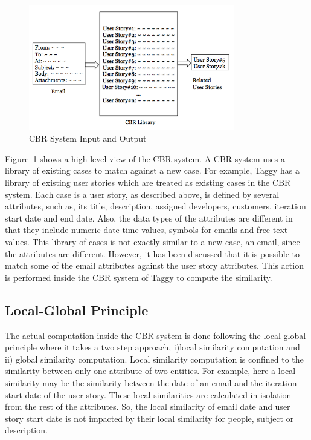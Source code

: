 \begin{figure}[bt]
	\centering
	\includegraphics[width=0.8\textwidth]{CBR.png}
    \caption{CBR System Input and Output}
	\label{fig:CBR}
\end{figure}

Figure~\ref{fig:CBR} shows a high level view of the CBR system. A CBR system uses a library of existing cases to match against a new case. For example, Taggy has a library of existing user stories which are treated as existing cases in the CBR system. Each case is a user story, as described above, is defined by several attributes, such as, its title, description, assigned developers, customers, iteration start date and end date. Also, the data types of the attributes are different in that they include numeric date time values, symbols for emails and free text values. This library of cases is not exactly similar to a new case, an email, since the attributes are different. However, it has been discussed that it is possible to match some of the email attributes against the user story attributes. This action is performed inside the CBR system of Taggy to compute the similarity.


\subsection{Local-Global Principle}

The actual computation inside the CBR system is done following the local-global principle\cite{local_global} where it takes a two step approach, i)local similarity computation and ii) global similarity computation. Local similarity computation is confined to the similarity between only one attribute of two entities. For example, here a local similarity may be the similarity between the date of an email and the iteration start date of the user story. These local similarities are calculated in isolation from the rest of the attributes. So, the local similarity of email date and user story start date is not impacted by their local similarity for people, subject or description.

